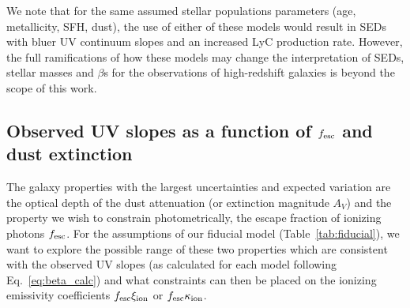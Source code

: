 We note that for the same assumed stellar populations parameters (age, metallicity, SFH, dust), the use of either of these models would result in SEDs with bluer UV continuum slopes and an increased LyC production rate. However, the full ramifications of how these models may change the interpretation of SEDs, stellar masses and $\beta$s for the observations of high-redshift galaxies is beyond the scope of this work. 

\subsection{Observed UV slopes as a function of $f_{\rm{esc}}$ and dust extinction}\label{sec:slp}
The galaxy properties with the largest uncertainties and expected variation are the optical depth of the dust attenuation (or extinction magnitude $A_{V}$)  and the property we wish to constrain photometrically, the escape fraction of ionizing photons $f_{\rm{esc}}$. For the assumptions of our fiducial model (Table~\ref{tab:fiducial}), we want to explore the possible range of these two properties which are consistent with the observed UV slopes (as calculated for each model following Eq.~\ref{eq:beta_calc}) and what constraints can then be placed on the ionizing emissivity coefficients $f_{\rm{esc}}\xi_{\rm{ion}}$ or $f_{\rm{esc}}\kappa_{\rm{ion}}$.

